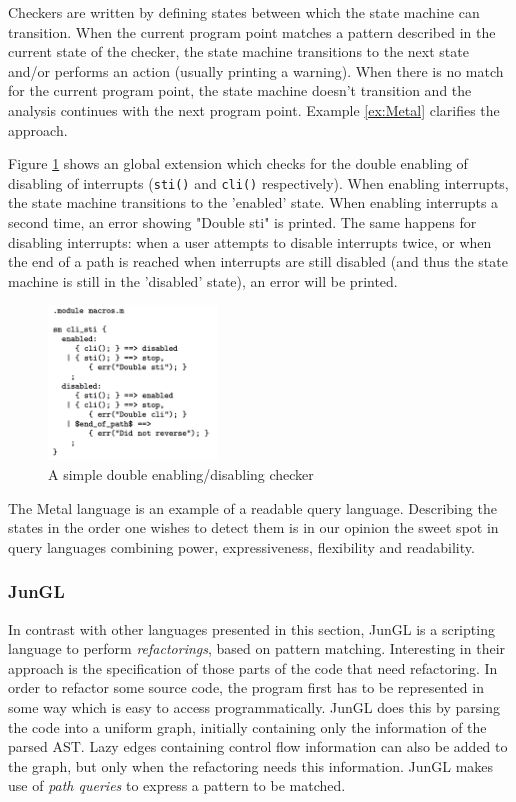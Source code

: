 Checkers are written by defining states between which the state machine can transition. When the current program point matches a pattern described in the current state of the checker, the state machine transitions to the next state and/or performs an action (usually printing a warning). When there is no match for the current program point, the state machine doesn't transition and the analysis continues with the next program point. Example \ref{ex:Metal} clarifies the approach. 
\begin{exmp}
\label{ex:Metal}
Figure \ref{fig:Metal} shows an global extension which checks for the double enabling of disabling of interrupts (\texttt{sti()} and \texttt{cli()} respectively). When enabling interrupts, the state machine transitions to the 'enabled' state. When enabling interrupts a second time, an error showing "Double sti" is printed. The same happens for disabling interrupts: when a user attempts to disable interrupts twice, or when the end of a path is reached when interrupts are still disabled (and thus the state machine is still in the 'disabled' state), an error will be printed.

\begin{figure}[h]
    \centering
      \includegraphics[width=0.4\textwidth]{images/Metal} 
      \caption{A simple double enabling/disabling checker}
    \label{fig:Metal}
\end{figure}

\end{exmp}

The Metal language is an example of a readable query language. Describing the states in the order one wishes to detect them is in our opinion the sweet spot in query languages combining power, expressiveness, flexibility and readability.

\subsubsection*{JunGL}

In contrast with other languages presented in this section, JunGL\cite{JunGL} is a scripting language to perform \textit{refactorings}, based on pattern matching. Interesting in their approach is the specification of those parts of the code that need refactoring. In order to refactor some source code, the program first has to be represented in some way which is easy to access programmatically. JunGL does this by parsing the code into a uniform graph, initially containing only the information of the parsed AST. Lazy edges containing control flow information can also be added to the graph, but only when the refactoring needs this information. JunGL makes use of \textit{path queries} to express a pattern to be matched. 

